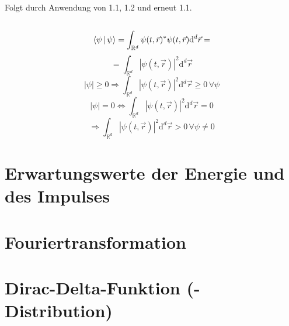 \documentclass[a4paper,11pt]{article}
\begin{document}
\subsection{}
Folgt durch Anwendung von 1.1, 1.2 und erneut 1.1.

\subsection{}
\begin{equation}
        \Braket{\psi|\psi} = \int_{\mathbb{R}^d}\psi(t,\vec{r})^*\psi(t,\vec{r})\text{d}^d\vec{r} =
\end{equation}
\begin{equation}
        = \int_{\mathbb{R}^d}|\psi(t,\vec{r})|^2\text{d}^d\vec{r}
\end{equation}
\begin{equation}
        |\psi|\geq 0 \Rightarrow \int_{\mathbb{R}^d}|\psi(t,\vec{r})|^2\text{d}^d\vec{r} \geq 0 \, \forall\psi
\end{equation}
\begin{equation}
        |\psi| = 0 \Leftrightarrow \int_{\mathbb{R}^d}|\psi(t,\vec{r})|^2\text{d}^d\vec{r} = 0
\end{equation}
\begin{equation}
        \Rightarrow \int_{\mathbb{R}^d}|\psi(t,\vec{r})|^2\text{d}^d\vec{r} > 0 \, \forall\psi \neq 0
\end{equation}
\section{Erwartungswerte der Energie und des Impulses}

\section{Fouriertransformation}

\section{Dirac-Delta-Funktion (-Distribution)}
\end{document}
